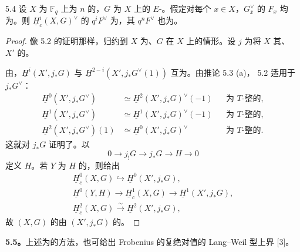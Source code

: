 \begin{SGAresult}{}{5.4}
设 $X$ 为 $\mathbb F_q$ 上为 $n$ 的，$G$ 为 $X$ 上的 $E$-。假定对每个 $x\in X$，$G_{\bar x}^\vee$ 的 $F_x$ 均为。则 $\underline H_c^i(X,G)^\vee$ 的 $q^iF^\vee$ 为，其 $q^nF^\vee$ 也为。
\end{SGAresult}
\begin{proof}
像 5.2 的证明那样，归约到 $X$ 为、$G$ 在 $X$ 上的情形。设 $j$ 为将 $X$ 其、 $X'$ 的。

由，$\underline H^i(X',j_*G)$ 与 $\underline H^{2-i}(X',j_*G^\vee(1))$ 互为。由推论 5.3 (a)， 5.2 适用于 $j_*G^\vee$：
\[
\begin{aligned}
\underline H^0(X',j_*G^\vee)&\simeq\underline H^2(X',j_*G)^\vee(-1)
&&\text{为 $T$-整的},\\
\underline H^1(X',j_*G^\vee)&\simeq\underline H^1(X',j_*G)^\vee(-1)
&&\text{为 $T$-整的},\\
\underline H^2(X',j_*G^\vee)(1)&\simeq\underline H^0(X',j_*G)^\vee
&&\text{为 $T$-整的}.
\end{aligned}
\]
这就对 $j_*G$ 证明了。以
\[
0\longrightarrow j_!G\longrightarrow j_*G\longrightarrow H\longrightarrow0
\]
定义 $H$。若 $Y$ 为 $H$ 的，则给出
\[
\begin{gathered}
\underline H_c^0(X,G)\hookrightarrow\underline H^0(X',j_*G),\\
\underline H^0(Y,H)\longrightarrow\underline H_c^1(X,G)\longrightarrow\underline H^1(X',j_*G),\\
\underline H_c^2(X,G)\xrightarrow{\sim}\underline H^2(X',j_*G),
\end{gathered}
\]
故 $(X,G)$ 的由 $(X',j_*G)$ 的。
\end{proof}

\textbf{5.5。}上述为的方法，也可给出 Frobenius 的复绝对值的 Lang--Weil 型上界 [3]。

